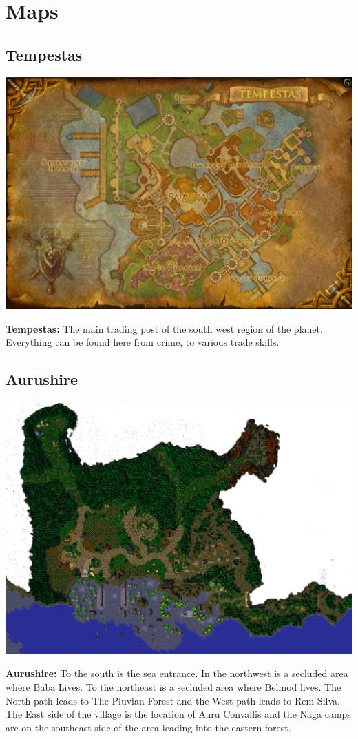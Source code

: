 \onecolumn
\chapter{Maps} \label{maps}

\section{Tempestas}
\begin{center}
	\includegraphics[width=\linewidth]{img/Tempestas.jpg}
	
	{\textbf{Tempestas:} The main trading post of the south west region of the planet. Everything can be found here from crime, to various trade skills.}
\end{center}

\section{Aurushire}
\begin{center}
	\includegraphics[width=\linewidth]{img/Aurushire.png}
	
	{\textbf{Aurushire:} To the south is the sea entrance. In the northwest is a secluded area where Baba Lives. To the northeast is a secluded area where Belmod lives. The North path leads to The Pluvian Forest and the West path leads to Rem Silva. The East side of the village is the location of Auru Convallis and the Naga camps are on the southeast side of the area leading into the eastern forest.}
\end{center}

